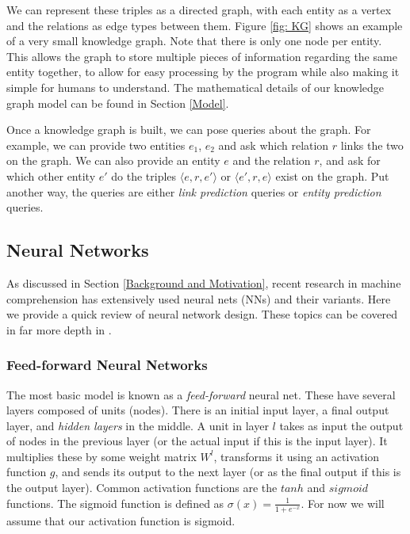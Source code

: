 \documentclass[pageno]{final_paper}
\begin{document}
We can represent these triples as a directed graph, with each entity as a vertex
and the relations as edge types between them. Figure \ref{fig: KG} shows an
example of a very small knowledge graph. Note that there is only one node per
entity. This allows the graph to store multiple pieces of information regarding
the same entity together, to allow for easy processing by the program while also
making it simple for humans to understand. The mathematical details of our
knowledge graph model can be found in Section \ref{Model}.

Once a knowledge graph is built, we can pose queries about the graph. For
example, we can provide two entities $e_1$, $e_2$ and ask which relation $r$
links the two on the graph. We can also provide an entity $e$ and the relation
$r$, and ask for which other entity $e'$ do the triples $\langle e,r,e' \rangle$
or $\langle e',r,e \rangle$ exist on the graph. Put another way, the queries are
either \textit{link prediction} queries or \textit{entity prediction} queries.

\subsection{Neural Networks}
\label{Neural Networks}

As discussed in Section \ref{Background and Motivation}, recent research in
machine comprehension has extensively used neural nets (NNs) and their variants.
Here we provide a quick review of neural network design. These topics can be
covered in far more depth in \cite{Bishop1995, Nielsen2015}.

\subsubsection{Feed-forward Neural Networks}
\label{Feed-forward Neural Networks}

The most basic model is known as a \textit{feed-forward} neural net. These have
several layers composed of units (nodes). There is an initial input layer, a
final output layer, and \textit{hidden layers} in the middle. A unit in layer
$l$ takes as input the output of nodes in the previous layer (or the actual
input if this is the input layer). It multiplies these by some weight matrix
$W^l$, transforms it using an activation function $g$, and sends its output to the
next layer (or as the final output if this is the output layer). Common
activation functions are the $tanh$ and $sigmoid$ functions. The sigmoid
function is defined as $\sigma (x) = \frac{1}{1+e^{-x}}$. For now we will assume
that our activation function is sigmoid.
\end{document}
